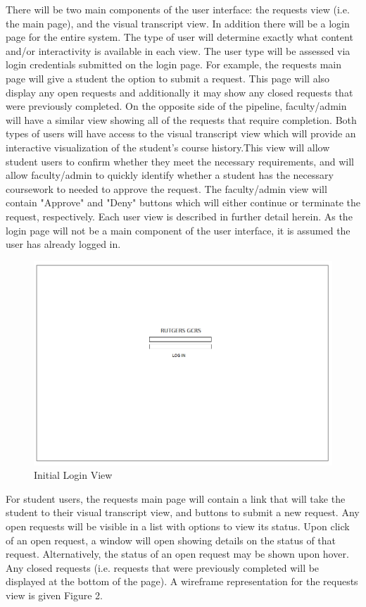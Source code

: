 There will be two main components of the user interface: the requests view (i.e. the main page), and the visual transcript view. In addition there will be a login page for the entire system. The type of user will determine exactly what content and/or interactivity is available in each view. The user type will be assessed via login credentials submitted on the login page. For example, the requests main page will give a student the option to submit a request. This page will also display any open requests and additionally it may show any closed requests that were previously completed. On the opposite side of the pipeline, faculty/admin will have a similar view showing all of the requests that require completion. Both types of users will have access to the visual transcript view which will provide an interactive visualization of the student's course history.This view will allow student users to confirm whether they meet the necessary requirements, and will allow faculty/admin to quickly identify whether a student has the necessary coursework to needed to approve the request. The faculty/admin view will contain "Approve" and "Deny" buttons which will either continue or terminate the request, respectively. Each user view is described in further detail herein. As the login page will not be a main component of the user interface, it is assumed the user has already logged in.

\begin{figure}
	\includegraphics[width=\linewidth]{login_page.png}
	\caption{Initial Login View}
	\label{fig:fig1}
\end{figure}

For student users, the requests main page will contain a link that will take the student to their visual transcript view, and buttons to submit a new request. Any open requests will be visible in a list with options to view its status. Upon click of an open request, a window will open showing details on the status of that request. Alternatively, the status of an open request may be shown upon hover. Any closed requests (i.e. requests that were previously completed will be displayed at the bottom of the page). A wireframe representation for the requests view is given Figure 2.

